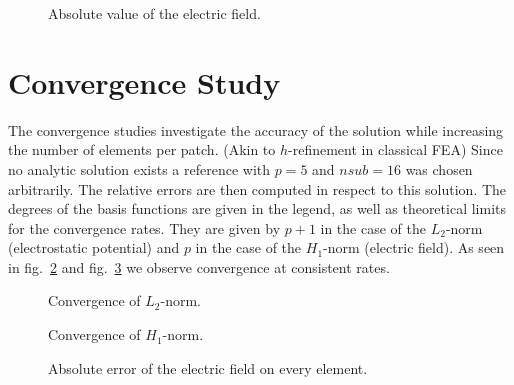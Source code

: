 \begin{center}
\begin{figure}[H]
  
  \caption{Absolute value of the electric field.}
  \label{fig:electric_field}
\end{figure}
\end{center}

\section{Convergence Study}
The convergence studies investigate the accuracy of the solution while increasing the number of elements per patch. (Akin to $h$-refinement in classical FEA) Since no analytic solution exists a reference with $p=5$ and $nsub=16$ was chosen arbitrarily. The relative errors are then computed in respect to this solution.
The degrees of the basis functions are given in the legend, as well as theoretical limits for the convergence rates. They are given by $p+1$ in the case of the $L_2$-norm (electrostatic potential) and $p$ in the case of the $H_1$-norm (electric field). As seen in fig.~\ref{fig:convergence_potential} and fig.~\ref{fig:convergence_gradient} we observe convergence at consistent rates.

\begin{figure}[H]
  
  \caption{Convergence of $L_2$-norm.}
  \label{fig:convergence_potential}
\end{figure}

\begin{figure}[H]
  
  \caption{Convergence of $H_1$-norm.}
  \label{fig:convergence_gradient}
\end{figure}

\begin{center}
\begin{figure}[H]
  
  \caption{Absolute error of the electric field on every element.}
  \label{fig:error_elem}
\end{figure}
\end{center}
